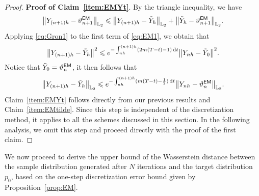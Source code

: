\begin{proof}
\noindent \textbf{Proof of Claim~\ref{item:EMYt}}. By the triangle inequality, we have
\begin{align}
    \label{eq:EM1}
    \l|Y_{(n+1)h}-\vartheta_{n+1}^{\sf EM}\r|_{\Ltwo}\leqslant \l|Y_{(n+1)h}-\tilde{Y}_{h}\r|_{\Ltwo}+\l|\tilde{Y}_h-\vartheta_{n+1}^{\sf EM}\r|_{\Ltwo}.
\end{align}
Applying \eqref{eq:Gron1} to the first term of \eqref{eq:EM1}, we obtain that
\begin{equation}
    \l|Y_{(n+1)h}-\tilde{Y}_h\r|^2\leqslant e^{-\int_{nh}^{(n+1)h}(2m(T-t)-1)\rmd t}\l|Y_{nh}-\tilde{Y}_0\r|^2.
    \label{eq:err1}
\end{equation}
Notice that $\tilde{Y}_0=\vartheta_n^{\sf EM}$, it then follows that
\begin{align*}
    \l|Y_{(n+1)h}-\tilde{Y}_h\r|_{\Ltwo}\leqslant e^{-\int_{nh}^{(n+1)h}(m(T-t)-\frac{1}{2})\rmd t}\l|Y_{nh}-\vartheta_n^{\sf EM}\r|_{\Ltwo}.
\end{align*}
Claim~\ref{item:EMYt} follows directly from our previous results and Claim~\ref{item:EMtilde}.
Since this step is independent of the discretization method, it applies to all the schemes discussed in this section. In the following analysis, we omit this step and proceed directly with the proof of the first claim.
\end{proof}

We now proceed to derive the upper bound of the Wasserstein distance between the sample distribution generated after $N$ iterations and the target distribution $p_0$, based on the one-step discretization error bound given by Proposition~\ref{prop:EM}.

